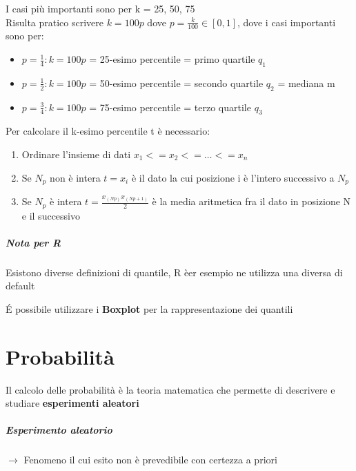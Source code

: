 \documentclass[12pt, a4paper, openany]{book}
\begin{document}
I casi più importanti sono per k = 25, 50, 75
\\ Risulta pratico scrivere $k = 100p$ dove $p = \frac{k}{100}\in [0, 1]$, dove i casi importanti sono per:
\begin{itemize} 
    \item $p = \frac{1}{4}: k = 100p$ = 25-esimo percentile = primo quartile $q_1$
    \item $p = \frac{1}{2}: k = 100p$ = 50-esimo percentile = secondo quartile $q_2$ = mediana m
    \item $p = \frac{3}{4}: k = 100p$ = 75-esimo percentile = terzo quartile $q_3$
\end{itemize}

Per calcolare il k-esimo percentile t è necessario:
\begin{enumerate}
    \item Ordinare l'insieme di dati $x_1 <= x_2 <= \dots <= x_n$
    \item Se $N_p$ non è intera $t=x_i$ è il dato la cui posizione i è l'intero successivo a $N_p$
    \item Se $N_p$ è intera $t = \frac{x_(Np) x_(Np+1)}{2}$ è la media aritmetica fra il dato in posizione N e il successivo 
\end{enumerate}

\paragraph{Nota per R} Esistono diverse definizioni di quantile, R èer esempio ne utilizza una diversa di default

\'E possibile utilizzare i \textbf{Boxplot} per la rappresentazione dei quantili

\chapter{Probabilità}
Il calcolo delle probabilità è la teoria matematica che permette di descrivere e studiare \textbf{esperimenti aleatori}
\paragraph{Esperimento aleatorio} $\to$ Fenomeno il cui esito non è prevedibile con certezza a priori
\end{document}

